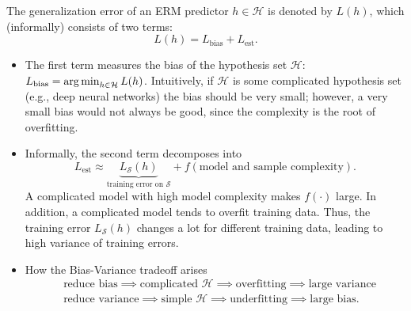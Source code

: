 The generalization error of an ERM predictor $h \in \mathcal{H}$ is denoted by $L(h)$, which (informally) consists of two terms:
    \begin{equation}
        L(h) = L_\text{bias} + L_\text{est}.
    \end{equation}
\begin{itemize}
    \item The first term measures the bias of the hypothesis set $\mathcal{H}$: $L_\text{bias} = \operatorname{arg\,min}_{h \in \mathcal{H}} L(h)$.
          Intuitively, if $\mathcal{H}$ is some complicated hypothesis set (e.g., deep neural networks) the bias should be very small; however, a very small bias would not always be good, since the complexity is the root of overfitting.
          
    \item Informally, the second term decomposes into
        \begin{equation}
            L_\text{est} \approx \underbrace{L_{\mathcal{S}}(h)}_{\text{training error on $\mathcal{S}$}} + f(\text{model and sample complexity}).
        \end{equation}
    A complicated model with high model complexity makes $f(\cdot)$ large.
    In addition, a complicated model tends to overfit training data.
    Thus, the training error $L_\mathcal{S}(h)$  changes a lot for different training data, leading to high variance of training errors. 
    
    \item How the Bias-Variance tradeoff arises
        \begin{equation}
            \begin{aligned}
                    & \text{reduce bias} \implies \text{complicated $\mathcal{H}$} \implies \text{overfitting} \implies \text{large variance} \\
                    & \text{reduce variance} \implies \text{simple $\mathcal{H}$}   \implies \text{underfitting} \implies \text{large bias}.
            \end{aligned}
        \end{equation}
\end{itemize}

